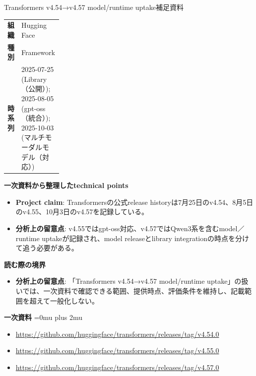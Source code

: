 \begin{technicalnote}{Transformers v4.54→v4.57 model/runtime uptake}{補足資料}
\begingroup
\begin{tabularx}{\linewidth}{@{}>{\bfseries}p{0.22\linewidth}X@{}}
組織 & Hugging Face \\
種別 & Framework \\
時系列 & 2025-07-25 (Library（公開）); 2025-08-05 (gpt-oss（統合）); 2025-10-03 (マルチモーダルモデル（対応）) \\
\end{tabularx}
\smallskip
{\bfseries 一次資料から整理したtechnical points}
\begin{itemize}[leftmargin=1.5em,itemsep=0.35em]
\item \textbf{Project claim}: Transformersの公式release historyは7月25日のv4.54、8月5日のv4.55、10月3日のv4.57を記録している。
\item \textbf{分析上の留意点}: v4.55ではgpt-oss対応、v4.57ではQwen3系を含むmodel／runtime uptakeが記録され、model releaseとlibrary integrationの時点を分けて追う必要がある。
\end{itemize}
\begin{minipage}{\linewidth}
{\bfseries 読む際の境界}
\begin{itemize}[leftmargin=1.5em,itemsep=0.35em]
\item \textbf{分析上の留意点}: 「Transformers v4.54→v4.57 model/runtime uptake」の扱いでは、一次資料で確認できる範囲、提供時点、評価条件を維持し、記載範囲を超えて一般化しない。
\end{itemize}
\begin{samepage}
{\bfseries 一次資料}
\begingroup\sloppy
\Urlmuskip=0mu plus 2mu\relax
\begin{itemize}[leftmargin=1.5em,itemsep=0.25em]
\item {\scriptsize\url{https://github.com/huggingface/transformers/releases/tag/v4.54.0}}
\item {\scriptsize\url{https://github.com/huggingface/transformers/releases/tag/v4.55.0}}
\item {\scriptsize\url{https://github.com/huggingface/transformers/releases/tag/v4.57.0}}
\end{itemize}
\endgroup
\end{samepage}
\end{minipage}
\endgroup
\end{technicalnote}
\medskip
